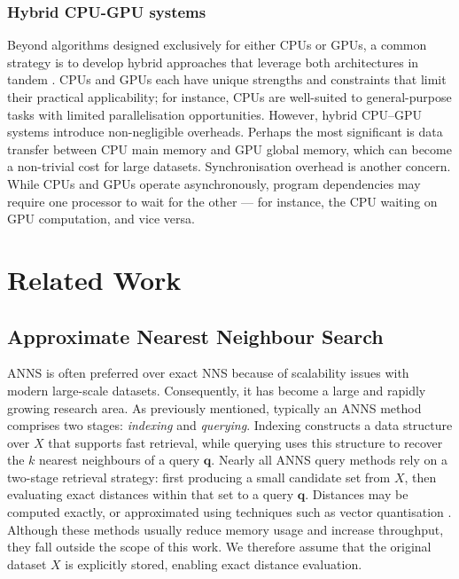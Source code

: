 \documentclass{article}
\newcommand{\bq}{\mathbf{q}}
\begin{document}
\subsubsection{Hybrid CPU-GPU systems}

Beyond algorithms designed exclusively for either CPUs or GPUs, a common strategy is to develop hybrid approaches that leverage both architectures in tandem \cite{mittal2015survey,rosenfeld2022query}. CPUs and GPUs each have unique strengths and constraints that limit their practical applicability; for instance, CPUs are well-suited to general-purpose tasks with limited parallelisation opportunities. However, hybrid CPU–GPU systems introduce non-negligible overheads. Perhaps the most significant is data transfer between CPU main memory and GPU global memory, which can become a non-trivial cost for large datasets. Synchronisation overhead is another concern. While CPUs and GPUs operate asynchronously, program dependencies may require one processor to wait for the other — for instance, the CPU waiting on GPU computation, and vice versa.

\section{Related Work}

\subsection{Approximate Nearest Neighbour Search}

ANNS is often preferred over exact NNS because of scalability issues with modern large-scale datasets. Consequently, it has become a large and rapidly growing research area. As previously mentioned, typically an ANNS method comprises two stages: \textit{indexing} and \textit{querying}. Indexing constructs a data structure over $X$ that supports fast retrieval, while querying uses this structure to recover the $k$ nearest neighbours of a query $\bq$. Nearly all ANNS query methods rely on a two-stage retrieval strategy: first producing a small candidate set from $X$, then evaluating exact distances within that set to a query $\bq$. Distances may be computed exactly, or approximated using techniques such as vector quantisation \cite{ge2013optimized, kalantidis2014locally, douze2025faiss}. Although these methods usually reduce memory usage and increase throughput, they fall outside the scope of this work. We therefore assume that the original dataset $X$ is explicitly stored, enabling exact distance evaluation.
\end{document}
